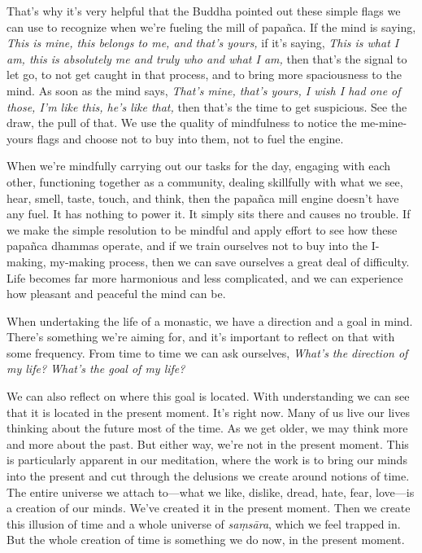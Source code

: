 That's why it's very helpful that the Buddha pointed out these simple 
flags we can use to recognize when we're fueling the mill of papañca. 
If the mind is saying, \emph{This is mine, this belongs to me, and 
that's yours,} if it's saying, \emph{This is what I am, this is 
absolutely me and truly who and what I am,} then that's the signal to 
let go, to not get caught in that process, and to bring more 
spaciousness to the mind. As soon as the mind says, \emph{That's mine, 
that's yours, I wish I had one of those, I'm like this, he's like 
that,} then that's the time to get suspicious. See the draw, the pull 
of that. We use the quality of mindfulness to notice the me-mine-yours 
flags and choose not to buy into them, not to fuel the engine.

When we're mindfully carrying out our tasks for the day, engaging with 
each other, functioning together as a community, dealing skillfully 
with what we see, hear, smell, taste, touch, and think, then the 
papañca mill engine doesn't have any fuel. It has nothing to power it. 
It simply sits there and causes no trouble. If we make the simple 
resolution to be mindful and apply effort to see how these papañca 
dhammas operate, and if we train ourselves not to buy into the 
I-making, my-making process, then we can save ourselves a great deal of 
difficulty. Life becomes far more harmonious and less complicated, and 
we can experience how pleasant and peaceful the mind can be.


When undertaking the life of a monastic, we have a direction and a goal 
in mind. There's something we're aiming for, and it's important to 
reflect on that with some frequency. From time to time we can ask 
ourselves, \emph{What's the direction of my life? What's the goal of my 
life?}

We can also reflect on where this goal is located. With understanding 
we can see that it is located in the present moment. It's right now. 
Many of us live our lives thinking about the future most of the time. 
As we get older, we may think more and more about the past. But either 
way, we're not in the present moment. This is particularly apparent in 
our meditation, where the work is to bring our minds into the present 
and cut through the delusions we create around notions of time. The 
entire universe we attach to---what we like, dislike, dread, hate, 
fear, love---is a creation of our minds. We've created it in the 
present moment. Then we create this illusion of time and a whole 
universe of \emph{saṃsāra}, which we feel trapped in. But the whole 
creation of time is something we do now, in the present moment.

